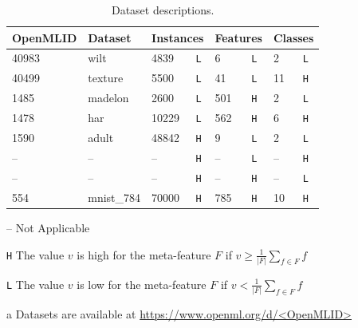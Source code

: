 \begin{table}[t]
    \caption{Dataset descriptions.}
    \footnotesize
    \label{hamlet-tbl:meta_features}
    \begin{threeparttable}
    \centering
        \begin{tabular}{ll|ll|ll|ll}
            \toprule
             \textbf{OpenMLID} \tnote{a} & \textbf{Dataset} & \multicolumn{2}{c}{\textbf{Instances}} & \multicolumn{2}{c}{\textbf{Features}} & \multicolumn{2}{c}{\textbf{Classes}}  \\ \midrule
             40983 & wilt & 4839 & \footnotesize{\texttt{L}} & 6 & \footnotesize{\texttt{L}} & 2 & \footnotesize{\texttt{L}}\\
             40499 & texture & 5500& \footnotesize{\texttt{L}} & 41& \footnotesize{\texttt{L}} & 11& \footnotesize{\texttt{H}}\\
             1485 & madelon & 2600 & \footnotesize{\texttt{L}} & 501 & \footnotesize{\texttt{H}} & 2 & \footnotesize{\texttt{L}}\\
             1478 & har & 10229 & \footnotesize{\texttt{L}} & 562& \footnotesize{\texttt{H}} & 6& \footnotesize{\texttt{H}}\\
             1590 & adult & 48842& \footnotesize{\texttt{H}} & 9& \footnotesize{\texttt{L}} & 2& \footnotesize{\texttt{L}}\\
             -- & -- & -- & \footnotesize{\texttt{H}} & -- & \footnotesize{\texttt{L}} & -- & \footnotesize{\texttt{H}}\\%
             -- & -- & -- & \footnotesize{\texttt{H}} & -- & \footnotesize{\texttt{H}} & -- & \footnotesize{\texttt{L}}\\%
             554 & mnist\_784 & 70000& \footnotesize{\texttt{H}} & 785& \footnotesize{\texttt{H}} & 10& \footnotesize{\texttt{H}}\\%
             \bottomrule
        \end{tabular}
        \label{hamlet-tbl:datasets}
        \begin{tablenotes}
            \item[--] {\scriptsize Not Applicable}
            \item[\texttt{H}] {\scriptsize The value $v$ is high for the meta-feature $F$ if $ v \geq \frac{1}{|F|}\sum_{f \in F} f$}
            \item[\texttt{L}] {\scriptsize The value $v$ is low for the meta-feature $F$ if $v < \frac{1}{|F|}\sum_{f \in F} f$}
            \item[a] {\scriptsize Datasets are available at \url{https://www.openml.org/d/<OpenMLID>}}
        \end{tablenotes}
    \end{threeparttable}
\end{table}

